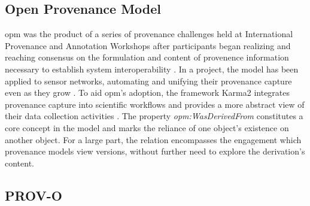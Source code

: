 \subsection{Open Provenance Model}

\gls{opm} was the product of a series of provenance challenges held at International Provenance and Annotation Workshops after participants began realizing and reaching consensus on the formulation and content of provenence information necessary to establish system interoperability \cite{moreau2008open}.
In a project, the model has been applied to sensor networks, automating and unifying their provenance capture even as they grow \cite{5478496}.
To aid \gls{opm}'s adoption, the framework Karma2 integrates provenance capture into scientific workflows and provides a more abstract view of their data collection activities \cite{simmhan2010karma2}.
The property \textit{opm:WasDerivedFrom} constitutes a core concept in the model and marks the reliance of one object's existence on another object.
For a large part, the relation encompasses the engagement which provenance models view versions, without further need to explore the derivation's content.

\subsection{PROV-O}\label{sec:prov}

